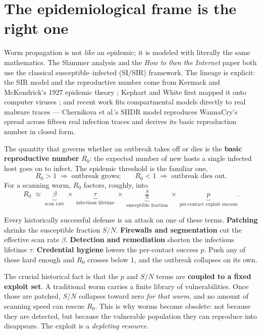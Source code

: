 \documentclass[11pt,a4paper]{article}
\begin{document}
\section{The epidemiological frame is the right one}

Worm propagation is not \emph{like} an epidemic; it is modeled with literally the same mathematics. The Slammer analysis \cite{slammer} and the \emph{How to 0wn the Internet} paper \cite{own} both use the classical susceptible--infected (SI/SIR) framework. The lineage is explicit: the SIR model and the reproductive number come from Kermack and McKendrick's 1927 epidemic theory \cite{kermack}; Kephart and White first mapped it onto computer viruses \cite{kephart}; and recent work fits compartmental models directly to real malware traces --- Chernikova et al.'s SIIDR model \cite{siidr} reproduces WannaCry's spread across fifteen real infection traces and derives its basic reproduction number in closed form.

The quantity that governs whether an outbreak takes off or dies is the \textbf{basic reproductive number} $R_0$: the expected number of new hosts a single infected host goes on to infect. The epidemic threshold is the familiar one,
\[
R_0 > 1 \;\Rightarrow\; \text{outbreak grows;} \qquad R_0 < 1 \;\Rightarrow\; \text{outbreak dies out.}
\]
For a scanning worm, $R_0$ factors, roughly, into
\[
R_0 \;\approx\; \underbrace{\beta}_{\text{scan rate}} \;\times\; \underbrace{\tau}_{\text{infectious lifetime}} \;\times\; \underbrace{\tfrac{S}{N}}_{\text{susceptible fraction}} \;\times\; \underbrace{p}_{\text{per-contact exploit success}}.
\]

Every historically successful defense is an attack on one of these terms. \textbf{Patching} shrinks the susceptible fraction $S/N$. \textbf{Firewalls and segmentation} cut the effective scan rate $\beta$. \textbf{Detection and remediation} shorten the infectious lifetime $\tau$. \textbf{Credential hygiene} lowers the per-contact success $p$. Push any of these hard enough and $R_0$ crosses below $1$, and the outbreak collapses on its own.

The crucial historical fact is that the $p$ and $S/N$ terms are \textbf{coupled to a fixed exploit set}. A traditional worm carries a finite library of vulnerabilities. Once those are patched, $S/N$ collapses toward zero \emph{for that worm}, and no amount of scanning speed can rescue $R_0$. This is why worms become obsolete: not because they are detected, but because the vulnerable population they can reproduce into disappears. The exploit is a \emph{depleting resource}.
\end{document}
